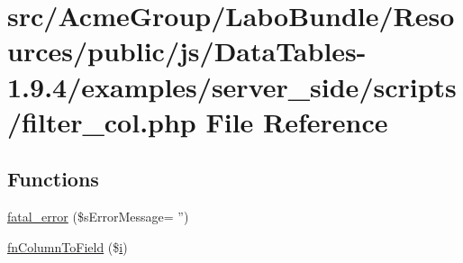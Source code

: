 \hypertarget{filter__col_8php}{\section{src/\+Acme\+Group/\+Labo\+Bundle/\+Resources/public/js/\+Data\+Tables-\/1.9.4/examples/server\+\_\+side/scripts/filter\+\_\+col.php File Reference}
\label{filter__col_8php}
}
\subsection*{Functions}
\begin{DoxyCompactItemize}
\item 
\hyperlink{filter__col_8php_a1bb235f2e57f0389e14b11592d32119a}{fatal\+\_\+error} (\$s\+Error\+Message= '')
\item 
\hyperlink{filter__col_8php_a44e8a9716677050f9e0d1dc3774a4721}{fn\+Column\+To\+Field} (\$\hyperlink{validate_8js_a5e25b1d1bed9ab5f3174b76d6a722180}{i})
\end{DoxyCompactItemize}
